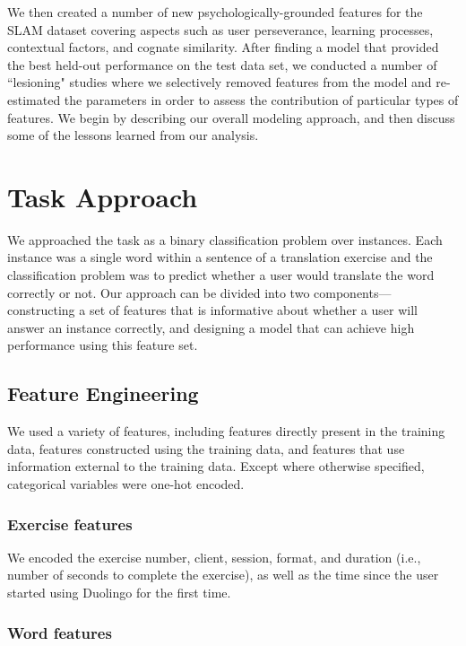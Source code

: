 \documentclass[11pt,a4paper]{article}
\begin{document}
We then created a number of new psychologically-grounded features for the SLAM
dataset covering aspects such as user perseverance, learning processes, 
contextual factors, and cognate similarity.  After finding a model that provided the best
held-out performance on the test data set, we conducted a number of ``lesioning" studies where
we selectively removed features from the model and re-estimated the parameters in order
to assess the contribution of particular types of features.  We begin by describing our 
overall modeling approach, and then discuss some of the lessons learned from our analysis.


\section{Task Approach}

We approached the task as a binary classification problem over instances. Each instance was
a single word within a sentence of a translation exercise and the classification problem was to predict whether a user would translate the word correctly or not. Our approach can be divided into two
components---constructing a set of features that is informative about
whether a user will answer an instance correctly, and designing a model that
can achieve high performance using this feature set.

\subsection{Feature Engineering}

We used a variety of features, including features directly present in the
training data, features constructed using the training data, and features that
use information external to the training data. Except where otherwise specified,
categorical variables were one-hot encoded.

\subsubsection{Exercise features}

We encoded the exercise number, client, session, format, and duration (i.e., number of
seconds to complete the exercise), as well as the time since the user started using Duolingo for the first time.

\subsubsection{Word features}
\end{document}
